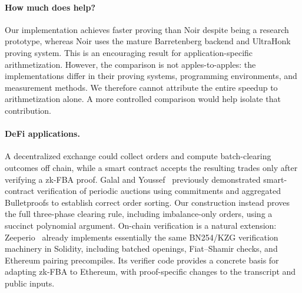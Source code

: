 \paragraph{How much does \ari help?} Our implementation achieves faster proving than Noir despite being a research prototype, whereas Noir uses the mature Barretenberg backend and UltraHonk proving system. This is an encouraging result for application-specific arithmetization. However, the comparison is not apples-to-apples: the implementations differ in their proving systems, programming environments, and measurement methods. We therefore cannot attribute the entire speedup to arithmetization alone. A more controlled comparison would help isolate that contribution.



\paragraph{DeFi applications.} A decentralized exchange could collect orders and compute batch-clearing outcomes off chain, while a smart contract accepts the resulting trades only after verifying a zk-FBA proof. Galal and Youssef~\cite{GY21} previously demonstrated smart-contract verification of periodic auctions using commitments and aggregated Bulletproofs to establish correct order sorting. Our construction instead proves the full three-phase clearing rule, including imbalance-only orders, using a succinct polynomial argument. On-chain verification is a natural extension: Zeeperio~\cite{MEC26} already implements essentially the same BN254/KZG verification machinery in Solidity, including batched openings, Fiat--Shamir checks, and Ethereum pairing precompiles. Its verifier code provides a concrete basis for adapting zk-FBA to Ethereum, with proof-specific changes to the transcript and public inputs. %


%

